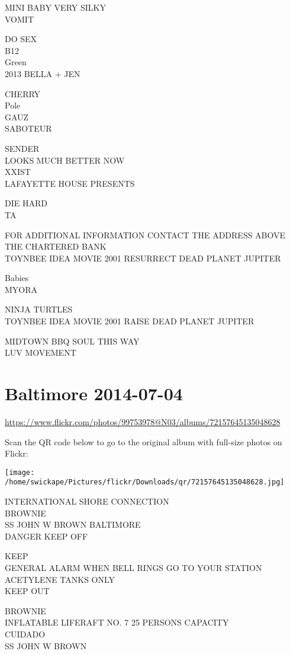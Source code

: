 \documentclass[10pt,letterpaper]{article}
\begin{document}
MINI BABY VERY SILKY\\
VOMIT

DO SEX\\
B12\\
Green\\
2013 BELLA + JEN

CHERRY\\
Pole\\
GAUZ\\
SABOTEUR

SENDER\\
LOOKS MUCH BETTER NOW\\
XXIST\\
LAFAYETTE HOUSE PRESENTS

DIE HARD\\
TA

FOR ADDITIONAL INFORMATION CONTACT THE ADDRESS ABOVE\\
THE CHARTERED BANK\\
TOYNBEE IDEA MOVIE 2001 RESURRECT DEAD PLANET JUPITER

Babies\\
MYORA

NINJA TURTLES\\
TOYNBEE IDEA MOVIE 2001 RAISE DEAD PLANET JUPITER

MIDTOWN BBQ SOUL THIS WAY\\
LUV MOVEMENT
\pagebreak

\section*{Baltimore 2014-07-04}

\url{https://www.flickr.com/photos/99753978@N03/albums/72157645135048628}

Scan the QR code below to go to the original album with full-size photos on Flickr:

\texttt{[image: /home/swickape/Pictures/flickr/Downloads/qr/72157645135048628.jpg]}
\pagebreak

INTERNATIONAL SHORE CONNECTION\\
BROWNIE\\
SS JOHN W BROWN BALTIMORE\\
DANGER KEEP OFF

KEEP\\
GENERAL ALARM WHEN BELL RINGS GO TO YOUR STATION\\
ACETYLENE TANKS ONLY\\
KEEP OUT

BROWNIE\\
INFLATABLE LIFERAFT NO. 7 25 PERSONS CAPACITY\\
CUIDADO\\
SS JOHN W BROWN
\end{document}
